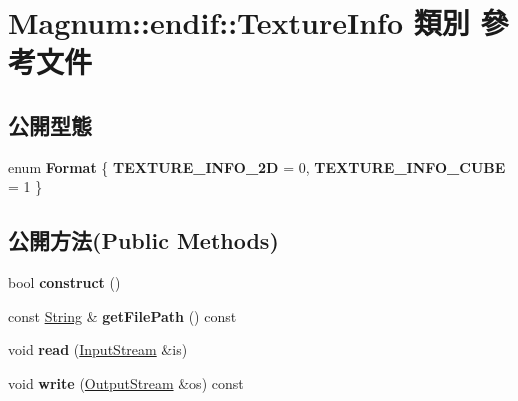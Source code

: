 \hypertarget{class_magnum_1_1endif_1_1_texture_info}{}\section{Magnum\+:\+:endif\+:\+:Texture\+Info 類別 參考文件}
\label{class_magnum_1_1endif_1_1_texture_info}
\subsection*{公開型態}
\begin{DoxyCompactItemize}
\item 
enum {\bfseries Format} \{ {\bfseries T\+E\+X\+T\+U\+R\+E\+\_\+\+I\+N\+F\+O\+\_\+2D} = 0, 
{\bfseries T\+E\+X\+T\+U\+R\+E\+\_\+\+I\+N\+F\+O\+\_\+\+C\+U\+BE} = 1
 \}\hypertarget{class_magnum_1_1endif_1_1_texture_info_a739e2a7a02f6937f9f1b7b4da7ed441c}{}\label{class_magnum_1_1endif_1_1_texture_info_a739e2a7a02f6937f9f1b7b4da7ed441c}

\end{DoxyCompactItemize}
\subsection*{公開方法(Public Methods)}
\begin{DoxyCompactItemize}
\item 
bool {\bfseries construct} ()\hypertarget{class_magnum_1_1endif_1_1_texture_info_affe7e3eedbcc39f4376b1ef50c516330}{}\label{class_magnum_1_1endif_1_1_texture_info_affe7e3eedbcc39f4376b1ef50c516330}

\item 
const \hyperlink{class_magnum_1_1_string}{String} \& {\bfseries get\+File\+Path} () const \hypertarget{class_magnum_1_1endif_1_1_texture_info_aa9aca2690e139344a32dd7fbfd0826ef}{}\label{class_magnum_1_1endif_1_1_texture_info_aa9aca2690e139344a32dd7fbfd0826ef}

\item 
void {\bfseries read} (\hyperlink{class_magnum_1_1_input_stream}{Input\+Stream} \&is)\hypertarget{class_magnum_1_1endif_1_1_texture_info_a5138dac6cb0ee4383fc7210dd141dad8}{}\label{class_magnum_1_1endif_1_1_texture_info_a5138dac6cb0ee4383fc7210dd141dad8}

\item 
void {\bfseries write} (\hyperlink{class_magnum_1_1_output_stream}{Output\+Stream} \&os) const \hypertarget{class_magnum_1_1endif_1_1_texture_info_a8df99fd821291571a204ca68a805e065}{}\label{class_magnum_1_1endif_1_1_texture_info_a8df99fd821291571a204ca68a805e065}

\end{DoxyCompactItemize}
